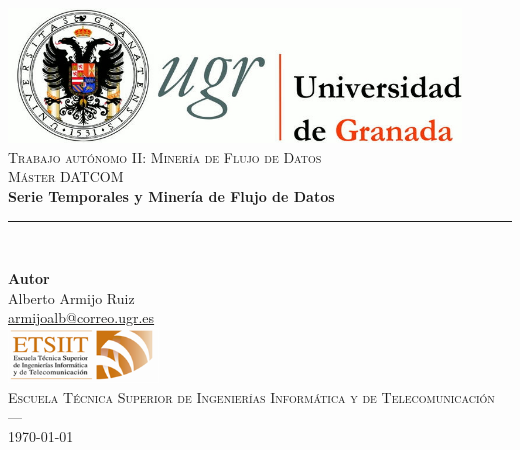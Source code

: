 \begin{titlepage}
\newlength{\centeroffset}
\setlength{\centeroffset}{-0.5\oddsidemargin}
\addtolength{\centeroffset}{0.5\evensidemargin}
\thispagestyle{empty}

\noindent\hspace*{\centeroffset}\begin{minipage}{\textwidth}

\centering
\includegraphics[width=0.9\textwidth]{imagenes/logo_ugr.jpg}\\[1.4cm]

\textsc{ \Large Trabajo autónomo II: Minería de Flujo de Datos\\[0.2cm]}
\textsc{ Máster DATCOM }\\[1cm]
% 
{\Huge\bfseries Serie Temporales y Minería de Flujo de Datos\\
}
\noindent\rule[-1ex]{\textwidth}{3pt}\\[3.5ex]
{\large\bfseries }
\end{minipage}

\vspace{1cm}
\noindent\hspace*{\centeroffset}\begin{minipage}{\textwidth}
\centering

\textbf{Autor}\\ {Alberto Armijo Ruiz \\
\href{armijoalb@correo.ugr.es}{armijoalb@correo.ugr.es}}\\[2.5ex]
\includegraphics[width=0.3\textwidth]{imagenes/etsiit_logo.png}\\[0.1cm]
\textsc{Escuela Técnica Superior de Ingenierías Informática y de Telecomunicación}\\
\textsc{---}\\
\today
\end{minipage}
\end{titlepage}